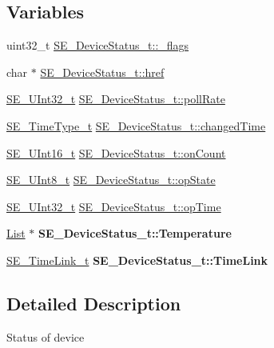 \subsection*{Variables}
\begin{DoxyCompactItemize}
\item 
uint32\+\_\+t \hyperlink{group__DeviceStatus_gaaf6c4544a5c3d62732dc559d43634149}{S\+E\+\_\+\+Device\+Status\+\_\+t\+::\+\_\+flags}
\item 
char $\ast$ \hyperlink{group__DeviceStatus_gac832af3c5e30f58a11ec61588798c6ea}{S\+E\+\_\+\+Device\+Status\+\_\+t\+::href}
\item 
\hyperlink{group__UInt32_ga70bd4ecda3c0c85d20779d685a270cdb}{S\+E\+\_\+\+U\+Int32\+\_\+t} \hyperlink{group__DeviceStatus_ga128ee35b8323aa8aa753b754fd502ec8}{S\+E\+\_\+\+Device\+Status\+\_\+t\+::poll\+Rate}
\item 
\hyperlink{group__TimeType_ga6fba87a5b57829b4ff3f0e7638156682}{S\+E\+\_\+\+Time\+Type\+\_\+t} \hyperlink{group__DeviceStatus_ga01b3f945cf198175ee85e8c068825f6e}{S\+E\+\_\+\+Device\+Status\+\_\+t\+::changed\+Time}
\item 
\hyperlink{group__UInt16_gac68d541f189538bfd30cfaa712d20d29}{S\+E\+\_\+\+U\+Int16\+\_\+t} \hyperlink{group__DeviceStatus_ga88599e2bbaa35b2fc2f340a24f873b13}{S\+E\+\_\+\+Device\+Status\+\_\+t\+::on\+Count}
\item 
\hyperlink{group__UInt8_gaf7c365a1acfe204e3a67c16ed44572f5}{S\+E\+\_\+\+U\+Int8\+\_\+t} \hyperlink{group__DeviceStatus_ga298a44d2837e5f528c9f81ec73c69fc7}{S\+E\+\_\+\+Device\+Status\+\_\+t\+::op\+State}
\item 
\hyperlink{group__UInt32_ga70bd4ecda3c0c85d20779d685a270cdb}{S\+E\+\_\+\+U\+Int32\+\_\+t} \hyperlink{group__DeviceStatus_ga6c24575c59f3ab054c989011e29e5d5d}{S\+E\+\_\+\+Device\+Status\+\_\+t\+::op\+Time}
\item 
\mbox{\label{group__DeviceStatus_ga3a85f6c56c803ade972114ad61aa46f1}} 
\hyperlink{structList}{List} $\ast$ {\bfseries S\+E\+\_\+\+Device\+Status\+\_\+t\+::\+Temperature}
\item 
\mbox{\label{group__DeviceStatus_gaaf5fe0853b729f379d83d698fd823d6c}} 
\hyperlink{structSE__TimeLink__t}{S\+E\+\_\+\+Time\+Link\+\_\+t} {\bfseries S\+E\+\_\+\+Device\+Status\+\_\+t\+::\+Time\+Link}
\end{DoxyCompactItemize}


\subsection{Detailed Description}
Status of device 

